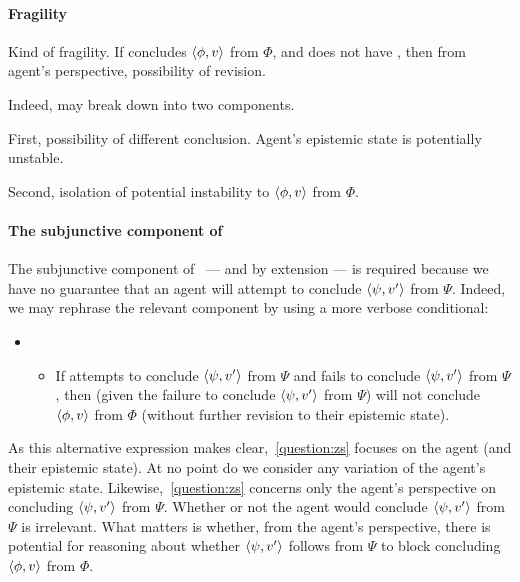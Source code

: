 \paragraph*{Fragility}

\begin{note}
  Kind of fragility.
  If concludes \(\langle \phi, v \rangle\) from \(\Phi\), and does not have \zs{}, then from agent's perspective, possibility of revision.

  Indeed, may break down into two components.

  First, possibility of different conclusion.
  Agent's epistemic state is potentially unstable.

  Second, isolation of potential instability to \(\langle \phi, v \rangle\) from \(\Phi\).
\end{note}

\paragraph*{The subjunctive component of \zs{}}

\begin{note}
  The subjunctive component of~\zs{} --- and by extension \qzs{} --- is required because we have no guarantee that an agent will attempt to conclude \(\langle \psi, v' \rangle\) from \(\Psi\).
  Indeed, we may rephrase the relevant component by using a more verbose conditional:

  \begin{itemize}
  \item[]
    \begin{itemize}
    \item
      If \vAgent{} attempts to conclude \(\langle \psi, v' \rangle\) from \(\Psi\) and fails to conclude \(\langle \psi, v' \rangle\) from \(\Psi\), then (given the failure to conclude  \(\langle \psi, v' \rangle\) from \(\Psi\)) \vAgent{} will not conclude \(\langle \phi, v \rangle\) from \(\Phi\) (without further revision to their epistemic state).
    \end{itemize}
  \end{itemize}

  As this alternative expression makes clear,~\autoref{question:zs} focuses on the agent (and their epistemic state).
  At no point do we consider any variation of the agent's epistemic state.
  Likewise,~\autoref{question:zs} concerns only the agent's perspective on concluding \(\langle \psi, v' \rangle\) from \(\Psi\).
  Whether or not the agent would conclude \(\langle \psi, v' \rangle\) from \(\Psi\) is irrelevant.
  What matters is whether, from the agent's perspective, there is potential for reasoning about whether \(\langle \psi, v' \rangle\) follows from \(\Psi\) to block concluding \(\langle \phi, v \rangle\) from \(\Phi\).
\end{note}

